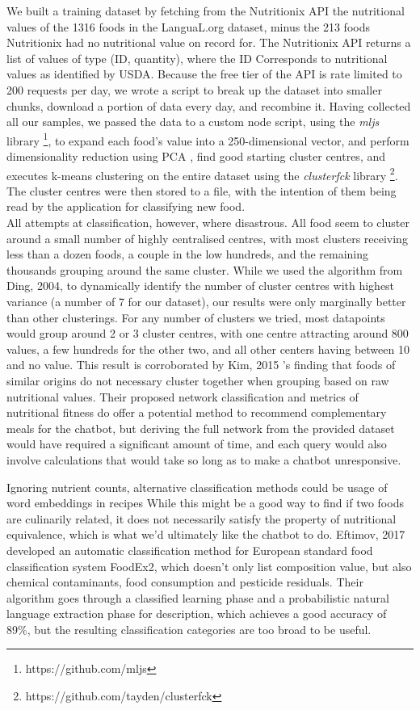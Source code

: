We built a training dataset by fetching from the Nutritionix API the nutritional values of the 1316 foods in the LanguaL.org dataset, minus the 213 foods Nutritionix had no nutritional value on record for. The Nutritionix API returns a list of values of type (ID, quantity), where the ID Corresponds to nutritional values as identified by USDA. Because the free tier of the API is rate limited to 200 requests per day, we wrote a script to break up the dataset into smaller chunks, download a portion of data every day, and recombine it. Having collected all our samples, we passed the data to a custom node script, using the \textit{mljs} library \footnote{https://github.com/mljs}, to expand each food's value into a 250-dimensional vector, and perform dimensionality reduction using PCA \cite{Ding2004}, find good starting cluster centres, and executes k-means clustering on the entire dataset using the \textit{clusterfck} library \footnote{https://github.com/tayden/clusterfck}. The cluster centres were then stored to a file, with the intention of them being read by the application for classifying new food. \\
All attempts at classification, however, where disastrous. All food seem to cluster around a small number of highly centralised centres, with most clusters receiving less than a dozen foods, a couple in the low hundreds, and the remaining thousands grouping around the same cluster. While we used the algorithm from Ding, 2004, to dynamically identify the number of cluster centres with highest variance (a number of 7 for our dataset), our results were only marginally better than other clusterings. For any number of clusters we tried, most datapoints would group around 2 or 3 cluster centres, with one centre attracting around 800 values, a few hundreds for the other two, and all other centers having between 10 and no value. This result is corroborated by Kim, 2015 \cite{Kim2015a}'s finding that foods of similar origins do not necessary cluster together when grouping based on raw nutritional values. Their proposed network classification and metrics of nutritional fitness do offer a potential method to recommend complementary meals for the chatbot, but deriving the full network from the provided dataset would have required a significant amount of time, and each query would also involve calculations that would take so long as to make a chatbot unresponsive.

Ignoring nutrient counts, alternative classification methods could be usage of word embeddings in recipes \cite{food2vec} While this might be a good way to find if two foods are culinarily related, it does not necessarily satisfy the property of nutritional equivalence, which is what we'd ultimately like the chatbot to do.
Eftimov, 2017 \cite{Eftimov2017} developed an automatic classification method for European standard food classification system FoodEx2, which doesn't only list composition value, but also chemical contaminants, food consumption and pesticide residuals. Their algorithm goes through a classified learning phase and a probabilistic natural language extraction phase for description, which achieves a good accuracy of 89\%, but the resulting classification categories are too broad to be useful.



